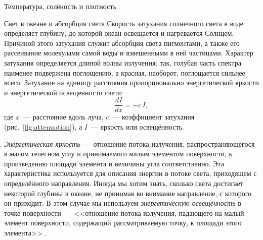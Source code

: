 \begin{chapter}{Температура, солёность и плотность}
\begin{section}{Свет в океане и абсорбция света}
Скорость затухания солнечного света в воде определяет глубину, до которой
океан освещается и нагревается Солнцем. Причиной этого затухания служит
абсорбция света пигментами, а также его рассеивание молекулами самой воды 
и взвешенными в ней частицами. Характер затухания определяется длиной волны
излучения: так, голубая часть спектра наименее подвержена поглощению, а
красная, наоборот, поглощается сильнее всего. Затухание на единицу расстояния
пропорционально энергетической яркости и энергетической освещенности света:
\begin{equation}
\frac{dI}{dx} = -c \, I,
\end{equation}
где $x$~--- расстояние вдоль луча, $c$~--- коэффициент затухания 
(рис.~\ref{fig:attenuation}), а $I$~--- яркость или освещённость.
%

\emph{Энергетическая яркость}~--- отношение потока излучения, 
распространяющегося в малом телесном углу и принимаемого малым элементом 
поверхности, к произведению площади элемента и величины угла соответственно.%
Эта характеристика используется для описания энергии в потоке света, 
приходящем с определённого направления. Иногда мы хотим знать, сколько света
достигает некоторой глубины в океане, не принимая во внимание
направление, с которого он приходит. В этом случае мы используем
\emph{энергетическую освещённость} в точке поверхности~--- <<отношение 
потока излучения, падающего на малый элемент поверхности, 
содержащий рассматриваемую точку, к площади этого элемента>>%
. 
%


\end{section}
\end{chapter}

